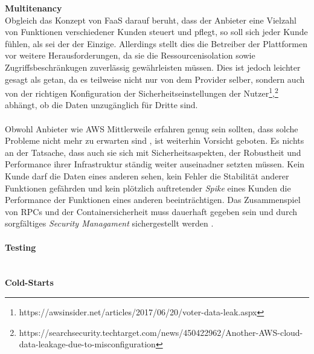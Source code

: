 \documentclass[11pt]{article}
\begin{document}
\glqq \textbf{Multitenancy}\grqq{}\\
Obgleich das Konzept von FaaS darauf beruht, dass der Anbieter eine Vielzahl von Funktionen verschiedener Kunden steuert und pflegt, so soll sich jeder Kunde fühlen, als sei der der Einzige. Allerdings stellt dies die Betreiber der Plattformen vor weitere Herausforderungen, da sie die Ressourcenisolation sowie Zugriffsbeschränkugen zuverlässig gewährleisten müssen. Dies ist jedoch leichter gesagt als getan, da es teilweise nicht nur von dem Provider selber, sondern auch von der richtigen Konfiguration der Sicherheitseinstellungen der Nutzer\footnote{https://awsinsider.net/articles/2017/06/20/voter-data-leak.aspx},\footnote{https://searchsecurity.techtarget.com/news/450422962/Another-AWS-cloud-data-leakage-due-to-misconfiguration} abhängt, ob die Daten unzugänglich für Dritte sind.\\\\ 
Obwohl Anbieter wie AWS Mittlerweile erfahren genug sein sollten, dass solche Probleme nicht mehr zu erwarten sind \cite{fowler2018serverless}, ist weiterhin Vorsicht geboten. Es nichts an der Tatsache, dass auch sie sich mit Sicherheitsaspekten, der Robustheit und Performance ihrer Infrastruktur ständig weiter auseinadner setzten müssen. Kein Kunde darf die Daten eines anderen sehen, kein Fehler die Stabilität anderer Funktionen gefährden und kein plötzlich auftretender \textit{Spike} eines Kunden die Performance der Funktionen eines anderen beeinträchtigen. Das Zusammenspiel von RPCs und der Containersicherheit muss dauerhaft gegeben sein und durch sorgfältiges \textit{Security Managament} sichergestellt werden \cite{mcgrath2017serverless}.\\\\ 
\textbf{Testing}\\
\\\\ 
\textbf{Cold-Starts}\\
\end{document}
